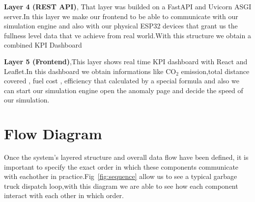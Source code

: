 \documentclass[12pt,a4paper]{report}
\begin{document}
\indent \textbf{Layer 4 (REST API)}, That layer was builded on a FastAPI and Uvicorn ASGI server.In this layer we make our frontend to be able to communicate with our simulation engine and also with our physical ESP32 devices that grant us the fullness level data that ve achieve from real world.With this structure we obtain a combined KPI Dashboard



\indent \textbf{Layer 5 (Frontend)},This layer shows real time KPI dashboard with React and Leaflet.In this dashboard we obtain informations like CO$_2$ emission,total distance covered , fuel cost , efficiency that calculated by a special formula and also we can start our simulation engine open the anomaly page and decide the speed of our simulation.

\section{Flow Diagram}


\indent Once the system’s layered structure and overall data flow have been defined, it is important to specify the exact order in which these components communicate with eachother in practice.Fig~\ref{fig:sequence} allow us to see a typical garbage truck dispatch loop,with this diagram we are able to see how each component interact with each other in which order.
\end{document}
